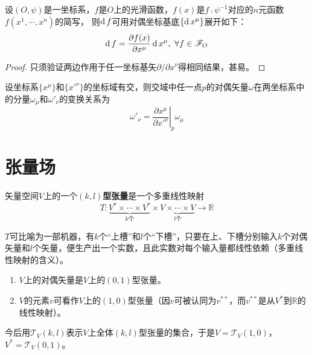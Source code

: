 \begin{theorem}
设$(O, \psi)$是一坐标系，$f$是$O$上的光滑函数，$f(x)$是$f \comp \psi^{-1}$对应的$n$元函数$f(x^1, \cdots, x^n)$的简写，
则$\operatorname{d} f$可用对偶坐标基底$\{\operatorname{d} x^\mu\}$展开如下：
$$\operatorname{d} f = \frac{\partial f(x)}{\partial x^\mu}\operatorname{d} x^\mu, ~ \forall f \in \mathscr{F}_O$$
\end{theorem}

\begin{proof}
只须验证两边作用于任一坐标基矢$\partial / \partial x^\nu$得相同结果，甚易。
\end{proof}

\begin{theorem}
设坐标系$\{x^\mu\}$和$\{x'^\nu\}$的坐标域有交，则交域中任一点$p$的对偶矢量$\omega$在两坐标系中的分量$\omega_\mu$和$\omega'_\nu$的变换关系为
$$\omega'_\nu = \left.\frac{\partial x^\mu}{\partial x'^\nu}\right|_p\omega_\mu$$
\end{theorem}

\section{张量场}

\begin{definition}
矢量空间$V$上的一个\textbf{$(k, l)$型张量}是一个多重线性映射
$$T \colon \underbrace{V^* \times \cdots \times V^*}_\text{$k$个} \times \underbrace{V \times \cdots \times V}_\text{$l$个} \to \mathbb{R}$$
\end{definition}

\begin{note}
$T$可比喻为一部机器，有$k$个``上槽''和$l$个``下槽''，只要在上、下槽分别输入$k$个对偶矢量和$l$个矢量，便生产出一个实数，且此实数对每个输入量都线性依赖（多重线性映射的含义）。
\end{note}

\begin{example}
\begin{enumerate}[（1）]
\item $V$上的对偶矢量是$V$上的$(0, 1)$型张量。
\item $V$的元素$v$可看作$V$上的$(1, 0)$型张量（因$v$可被认同为$v^{**}$，而$v^{**}$是从$V^*$到$\mathbb{R}$的线性映射）。
\end{enumerate}
\end{example}

今后用$\mathscr{T}_V(k, l)$表示$V$上全体$(k, l)$型张量的集合，于是$V = \mathscr{T}_V(1, 0)$，$V^* = \mathscr{T}_V(0, 1)$。

